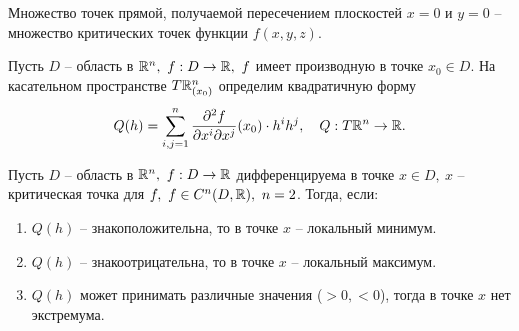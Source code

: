 \begin{note}
    Множество точек прямой, получаемой пересечением плоскостей $x = 0$ и $y = 0$ -- множество критических точек функции $f(x,y,z)$.
\end{note}

\begin{definition}
    Пусть $ D $ -- область в $ \R^n, \ f: D \rightarrow\R, \ f $ имеет производную в точке $ x_0 \in D $. На касательном пространстве $ T\mathbb{R}_{(x_0)}^n $ определим квадратичную форму
    \[
        Q(h) = \sum_{i,j = 1}^{n}\frac{\partial^2f}{\partial x^i\partial x^j}(x_0)\cdot h^ih^j,\quad Q:T\mathbb{R}^n \rightarrow \mathbb{R}.
    \]
\end{definition}

\begin{theorem}
    Пусть $D$ -- область в $\mathbb{R}^n, \ f: D \rightarrow \mathbb{R}$ дифференцируема в точке $x \in D, \ x$ -- критическая точка для $f, \ f \in C^n(D,\mathbb{R}), \ n = 2$. Тогда, если:
    \begin{enumerate}
        \item $Q(h)$ -- знакоположительна, то в точке $x$ -- локальный минимум.
        \item $Q(h)$ -- знакоотрицательна, то в точке $x$ -- локальный максимум.
        \item $Q(h)$ может принимать различные значения ($>0, < 0$), тогда в точке $x$ нет экстремума.
    \end{enumerate}
\end{theorem}

